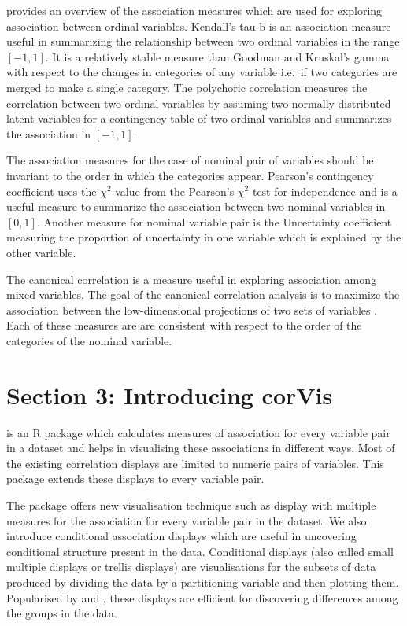 \citet{agresti2010analysis} provides an overview of the association
measures which are used for exploring association between ordinal
variables. Kendall's tau-b \citep{kendall1945treatment} is an
association measure useful in summarizing the relationship between two
ordinal variables in the range \([-1,1]\). It is a relatively stable
measure than Goodman and Kruskal's gamma with respect to the changes in
categories of any variable i.e.~if two categories are merged to make a
single category. The polychoric correlation \citep{olsson1979maximum}
measures the correlation between two ordinal variables by assuming two
normally distributed latent variables for a contingency table of two
ordinal variables and summarizes the association in \([-1,1]\).

The association measures for the case of nominal pair of variables
should be invariant to the order in which the categories appear.
Pearson's contingency coefficient uses the \({\chi}^2\) value from the
Pearson's \({\chi}^2\) test for independence and is a useful measure to
summarize the association between two nominal variables in \([0,1]\).
Another measure for nominal variable pair is the Uncertainty coefficient
\citep{theil1970estimation} measuring the proportion of uncertainty in
one variable which is explained by the other variable.

The canonical correlation is a measure useful in exploring association
among mixed variables. The goal of the canonical correlation analysis is
to maximize the association between the low-dimensional projections of
two sets of variables \citep{hardle2019applied}. Each of these measures
are are consistent with respect to the order of the categories of the
nominal variable.

\hypertarget{section-3-introducing-corvis}{%
\section{Section 3: Introducing
corVis}\label{section-3-introducing-corvis}}

 is an R package which calculates measures of
association for every variable pair in a dataset and helps in
visualising these associations in different ways. Most of the existing
correlation displays are limited to numeric pairs of variables. This
package extends these displays to every variable pair.

The package offers new visualisation technique such as display with
multiple measures for the association for every variable pair in the
dataset. We also introduce conditional association displays which are
useful in uncovering conditional structure present in the data.
Conditional displays (also called small multiple displays or trellis
displays) are visualisations for the subsets of data produced by
dividing the data by a partitioning variable and then plotting them.
Popularised by \citet{tufte1986thevisual} and
\citet{becker1996thevisual}, these displays are efficient for
discovering differences among the groups in the data.

